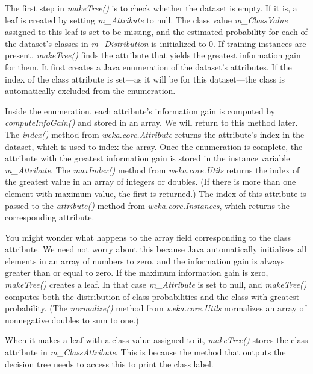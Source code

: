 The first step in \textit{makeTree()} is to check whether the dataset is
empty. If it is, a leaf is created by setting \textit{m\_Attribute} to null. The
class value \textit{m\_ClassValue} assigned to this leaf is set to be missing,
and the estimated probability for each of the dataset's classes in
\textit{m\_Distribution} is initialized to 0. If training instances are present,
\textit{makeTree()} finds the attribute that yields the greatest information
gain for them. It first creates a Java enumeration of the dataset's
attributes. If the index of the class attribute is set---as it will be
for this dataset---the class is automatically excluded from the
enumeration.

Inside the enumeration, each attribute's information gain is computed
by \textit{computeInfoGain()} and stored in an array. We will return
to this method later. The \textit{index()} method
from \textit{weka.core.Attribute} returns the attribute's index in the
dataset, which is used to index the array. Once the enumeration is
complete, the attribute with the greatest information gain is stored
in the instance variable \textit{m\_Attribute}. The \textit{maxIndex()} method from
\textit{weka.core.Utils} returns the index of the greatest value in an array of
integers or doubles. (If there is more than one element with maximum
value, the first is returned.) The index of this attribute is passed
to the \textit{attribute()} method from \textit{weka.core.Instances},
which returns the corresponding attribute.

You might wonder what happens to the array field corresponding to the
class attribute. We need not worry about this because Java
automatically initializes all elements in an array of numbers to zero,
and the information gain is always greater than or equal to zero. If
the maximum information gain is zero, \textit{makeTree()} creates a
leaf. In that case \textit{m\_Attribute} is set to null,
and \textit{makeTree()} computes both the distribution of class
probabilities and the class with greatest probability. (The
\textit{normalize()} method from \textit{weka.core.Utils} normalizes 
an array of nonnegative doubles to sum to one.)

When it makes a leaf with a class value assigned to
it, \textit{makeTree()} stores the class attribute
in \textit{m\_ClassAttribute}. This is because the method that outputs
the decision tree needs to access this to print the class label.


